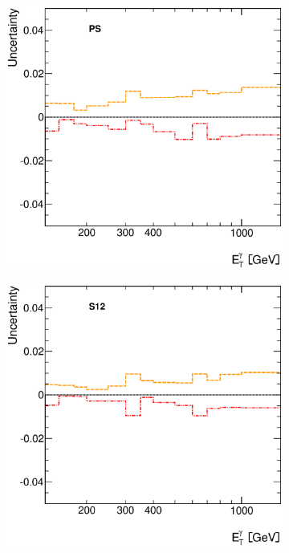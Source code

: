 \documentclass[12pt, twoside]{article}
\numberwithin{equation}{section}
\numberwithin{figure}{section}
\newenvironment{changemargin}[2]{%
\begin{list}{}{%
\setlength{\topsep}{0pt}%
\setlength{\leftmargin}{#1}%
\setlength{\rightmargin}{#2}%
\setlength{\listparindent}{\parindent}%
\setlength{\itemindent}{\parindent}%
\setlength{\parsep}{\parskip}%
}%
\item[]}{\end{list}}
\begin{document}
\begin{figure}
\begin{changemargin}{-1.0cm}{-0.75cm}
\begin{changemargin}{-0.75cm}{-1.0cm}
\begin{subfigure}[b]{0.27\textwidth}
        \end{subfigure}
        \begin{subfigure}[b]{0.27\textwidth}
            \includegraphics[width=\textwidth]{./images/PhotonSystematics/PhotonSystematic-22.eps}
        \end{subfigure}
        \begin{subfigure}[b]{0.27\textwidth}
            \includegraphics[width=\textwidth]{./images/PhotonSystematics/PhotonSystematic-23.eps}
        \end{subfigure}


\end{changemargin}
\end{changemargin}
\end{figure}
\end{document}
